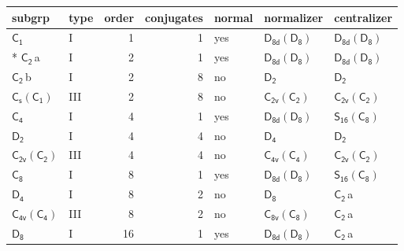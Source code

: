 \documentclass[10pt,a4paper]{article}
\numberwithin{equation}{section}
\newcommand{\grp}[1]{\mathsf{#1}}
\newcommand{\clsletter}[1]{\,{\scriptsize\color{black!55}#1}}
\begin{document}
{\small\begin{longtable}{@{}llrrlll@{}}\toprule
subgrp & type & order & conjugates & normal & normalizer & centralizer\\\midrule\endhead
\bottomrule\endfoot\endlastfoot
\href{../../../rotation/data/pdf/C1.pdf}{$\grp{C_{1}}$} & I & 1 & 1 & yes & \href{D8d-D8.pdf}{$\grp{D_{8d}}(\grp{D_{8}})$} & \href{D8d-D8.pdf}{$\grp{D_{8d}}(\grp{D_{8}})$}\\*
\href{../../../rotation/data/pdf/C2.pdf}{$\grp{C_{2}}$}\clsletter{a} & I & 2 & 1 & yes & \href{D8d-D8.pdf}{$\grp{D_{8d}}(\grp{D_{8}})$} & \href{D8d-D8.pdf}{$\grp{D_{8d}}(\grp{D_{8}})$}\\
\href{../../../rotation/data/pdf/C2.pdf}{$\grp{C_{2}}$}\clsletter{b} & I & 2 & 8 & no & \href{../../../rotation/data/pdf/D2.pdf}{$\grp{D_{2}}$} & \href{../../../rotation/data/pdf/D2.pdf}{$\grp{D_{2}}$}\\
\href{C1v-C1.pdf}{$\grp{C_{s}}(\grp{C_{1}})$} & III & 2 & 8 & no & \href{C2v-C2.pdf}{$\grp{C_{2v}}(\grp{C_{2}})$} & \href{C2v-C2.pdf}{$\grp{C_{2v}}(\grp{C_{2}})$}\\
\href{../../../rotation/data/pdf/C4.pdf}{$\grp{C_{4}}$} & I & 4 & 1 & yes & \href{D8d-D8.pdf}{$\grp{D_{8d}}(\grp{D_{8}})$} & \href{S16-C8.pdf}{$\grp{S_{16}}(\grp{C_{8}})$}\\
\href{../../../rotation/data/pdf/D2.pdf}{$\grp{D_{2}}$} & I & 4 & 4 & no & \href{../../../rotation/data/pdf/D4.pdf}{$\grp{D_{4}}$} & \href{../../../rotation/data/pdf/D2.pdf}{$\grp{D_{2}}$}\\
\href{C2v-C2.pdf}{$\grp{C_{2v}}(\grp{C_{2}})$} & III & 4 & 4 & no & \href{C4v-C4.pdf}{$\grp{C_{4v}}(\grp{C_{4}})$} & \href{C2v-C2.pdf}{$\grp{C_{2v}}(\grp{C_{2}})$}\\
\href{../../../rotation/data/pdf/C8.pdf}{$\grp{C_{8}}$} & I & 8 & 1 & yes & \href{D8d-D8.pdf}{$\grp{D_{8d}}(\grp{D_{8}})$} & \href{S16-C8.pdf}{$\grp{S_{16}}(\grp{C_{8}})$}\\
\href{../../../rotation/data/pdf/D4.pdf}{$\grp{D_{4}}$} & I & 8 & 2 & no & \href{../../../rotation/data/pdf/D8.pdf}{$\grp{D_{8}}$} & \href{../../../rotation/data/pdf/C2.pdf}{$\grp{C_{2}}$}\clsletter{a}\\
\href{C4v-C4.pdf}{$\grp{C_{4v}}(\grp{C_{4}})$} & III & 8 & 2 & no & \href{C8v-C8.pdf}{$\grp{C_{8v}}(\grp{C_{8}})$} & \href{../../../rotation/data/pdf/C2.pdf}{$\grp{C_{2}}$}\clsletter{a}\\
\href{../../../rotation/data/pdf/D8.pdf}{$\grp{D_{8}}$} & I & 16 & 1 & yes & \href{D8d-D8.pdf}{$\grp{D_{8d}}(\grp{D_{8}})$} & \href{../../../rotation/data/pdf/C2.pdf}{$\grp{C_{2}}$}\clsletter{a}\\

\end{longtable}}
\end{document}
